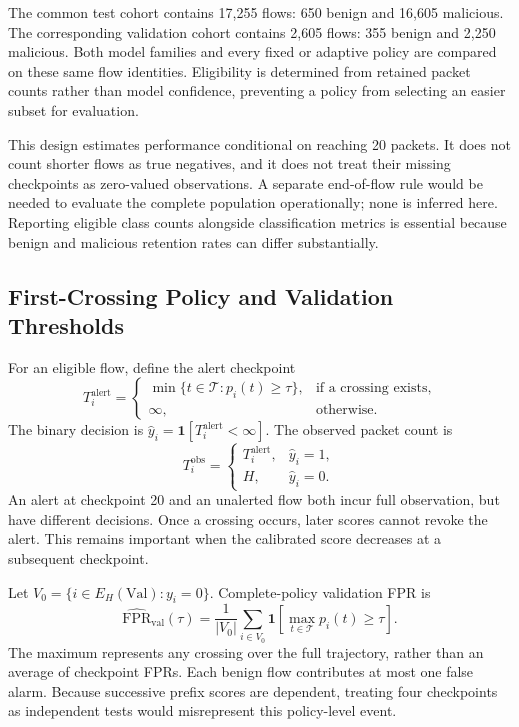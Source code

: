 \documentclass[conference]{IEEEtran}
\begin{document}
The common test cohort contains 17,255 flows: 650 benign and 16,605 malicious. The corresponding validation cohort contains 2,605 flows: 355 benign and 2,250 malicious. Both model families and every fixed or adaptive policy are compared on these same flow identities. Eligibility is determined from retained packet counts rather than model confidence, preventing a policy from selecting an easier subset for evaluation.

This design estimates performance conditional on reaching 20 packets. It does not count shorter flows as true negatives, and it does not treat their missing checkpoints as zero-valued observations. A separate end-of-flow rule would be needed to evaluate the complete population operationally; none is inferred here. Reporting eligible class counts alongside classification metrics is essential because benign and malicious retention rates can differ substantially.

\subsection{First-Crossing Policy and Validation Thresholds}
For an eligible flow, define the alert checkpoint
\begin{equation}
T_i^{\mathrm{alert}}=
\begin{cases}
\min\{t\in\mathcal{T}:p_i(t)\ge\tau\},
   & \text{if a crossing exists},\\
\infty, & \text{otherwise}.
\end{cases}
\label{eq:first_crossing}
\end{equation}
The binary decision is $\widehat{y}_i=\mathbf{1}[T_i^{\mathrm{alert}}<\infty]$. The observed packet count is
\begin{equation}
T_i^{\mathrm{obs}}=
\begin{cases}
T_i^{\mathrm{alert}}, & \widehat{y}_i=1,\\
H, & \widehat{y}_i=0.
\end{cases}
\label{eq:observed_packets}
\end{equation}
An alert at checkpoint 20 and an unalerted flow both incur full observation, but have different decisions. Once a crossing occurs, later scores cannot revoke the alert. This remains important when the calibrated score decreases at a subsequent checkpoint.

Let $V_0=\{i\in E_H(\mathrm{Val}):y_i=0\}$. Complete-policy validation FPR is
\begin{equation}
\widehat{\mathrm{FPR}}_{\mathrm{val}}(\tau)
=\frac{1}{|V_0|}
\sum_{i\in V_0}
\mathbf{1}\!\left[\max_{t\in\mathcal{T}}p_i(t)\ge\tau\right].
\label{eq:policy_fpr}
\end{equation}
The maximum represents any crossing over the full trajectory, rather than an average of checkpoint FPRs. Each benign flow contributes at most one false alarm. Because successive prefix scores are dependent, treating four checkpoints as independent tests would misrepresent this policy-level event.
\end{document}
